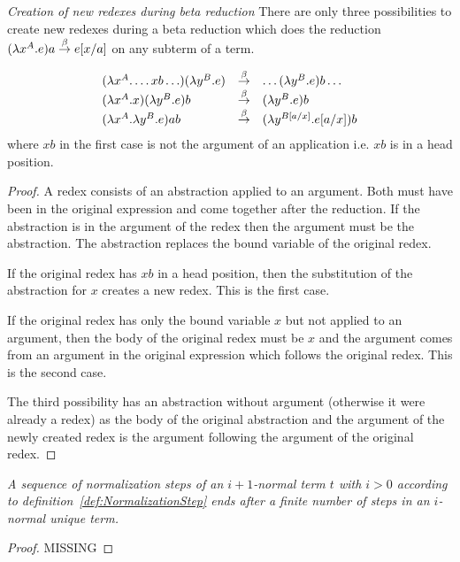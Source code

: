 \begin{theorem}
    \label{thm:NewRedexCreation}
    \emph{Creation of new redexes during beta reduction} There are only three
    possibilities to create new redexes during a beta reduction which does the
    reduction $(\lambda x^A.e) a \reduce \sub a x e$ on any subterm of a term.

    $$
    \begin{array}{lll}
        (\lambda x^A. \ldots xb \ldots) (\lambda y^B. e)
        &\reduce&
        \ldots (\lambda y^B.e) b \ldots
        \\
        (\lambda x^A. x)(\lambda y^B. e) b
        &\reduce&
        (\lambda y^B. e) b
        \\
        (\lambda x^A . \lambda y^B. e) a b
        &\reduce&
        (\lambda y^{B[a/x]}. e[a/x]) b
    \end{array}
    $$
    where $xb$ in the first case is not the argument of an application i.e. $xb$
    is in a head position.

    \begin{proof}
        A redex consists of an abstraction applied to an argument. Both must
        have been in the original expression and come together after the
        reduction. If the abstraction is in the argument of the redex then the
        argument must be the abstraction. The abstraction replaces the bound
        variable of the original redex.

        If the original redex has $x b$ in a head position, then the
        substitution of the abstraction for $x$ creates a new redex. This is the
        first case.

        If the original redex has only the bound variable $x$ but not applied to
        an argument, then the body of the original redex must be $x$ and the
        argument comes from an argument in the original expression which follows
        the original redex. This is the second case.

        The third possibility has an abstraction without argument (otherwise it
        were already a redex) as the body of the original abstraction and the
        argument of the newly created redex is the argument following the
        argument of the original redex.
    \end{proof}
\end{theorem}



\begin{theorem}
    \emph{A sequence of normalization steps of an $i+1$-normal term $t$ with $i
    > 0$ according to definition~\ref{def:NormalizationStep} ends after a finite
    number of steps in an $i$-normal unique term.}

    \begin{proof}
        MISSING
    \end{proof}
\end{theorem}
